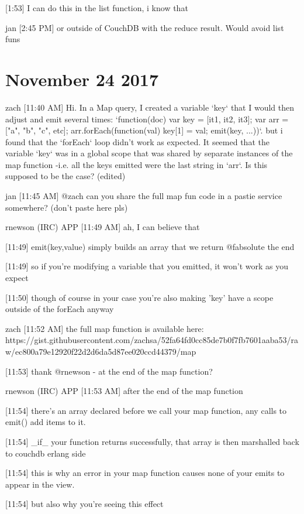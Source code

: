 [1:53]
I can do this in the list function, i know that

jan [2:45 PM]
or outside of CouchDB with the reduce result. Would avoid list funs

\section{November 24 2017}
\label{slack-24-nov}
zach [11:40 AM]
Hi. In a Map query, I created a variable `key` that I would then adjust and emit several times: `function(doc) {var key = [it1, it2, it3]; var arr = ["a", "b", "c", etc]; arr.forEach(function(val) {key[1] = val; emit(key, ...)})}`. but i found that the `forEach` loop didn't work as expected. It seemed that the variable `key` was in a global scope that was shared by separate instances of the map function -i.e. all the keys emitted were the last string in `arr`. Is this supposed to be the case? (edited)

jan [11:45 AM]
@zach can you share the full map fun code in a pastie service somewhere? (don’t paste here pls)

rnewson (IRC) APP [11:49 AM]
ah, I can believe that

    [11:49]
emit(key,value) simply builds an array that we return @fabsolute the end

    [11:49]
so if you're modifying a variable that you emitted, it won't work as you expect

    [11:50]
though of course in your case you're also making 'key' have a scope outside of the forEach anyway

zach [11:52 AM]
the full map function is available here: https://gist.githubusercontent.com/zachsa/52fa64fd0cc85de7b0f7fb7601aaba53/raw/ec800a79e12920f22d2d6da5d87ee020ccd44379/map%

[11:53]
thank @rnewson - at the end of the map function?

rnewson (IRC) APP [11:53 AM]
after the end of the map function

    [11:54]
there's an array declared before we call your map function, any calls to emit() add items to it.

[11:54]
\_if\_ your function returns successfully, that array is then marshalled back to couchdb erlang side

    [11:54]
this is why an error in your map function causes none of your emits to appear in the view.

[11:54]
but also why you're seeing this effect

